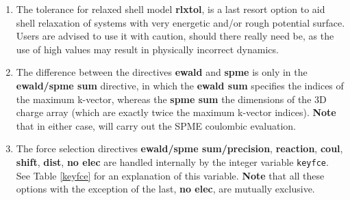 \begin{enumerate}
\item The tolerance for relaxed shell model {\bf rlxtol}, is a last
resort option to aid shell relaxation of systems with very energetic
and/or rough potential surface.  Users are advised to use it with
caution, should there really need be, as the use of high values may
result in physically incorrect dynamics.

\item The difference between the directives {\bf ewald} and {\bf spme}
is only in the {\bf ewald/spme sum} directive, in which the
{\bf ewald sum} specifies the indices of the maximum k-vector, whereas
the {\bf spme sum} the dimensions of the 3D charge array
(which are exactly twice the maximum k-vector indices).  {\bf Note}
that in either case, \D will carry out the
SPME coulombic evaluation.

\item The force selection directives
{\bf ewald/spme sum/precision},
{\bf reaction}, {\bf coul}, {\bf shift}, {\bf dist}, {\bf no elec}
are handled internally by the integer variable {\tt keyfce}.
See Table \ref{keyfce} for an explanation of this variable.
{\bf Note} that all these options with the exception of the last,
{\bf no elec}, are mutually exclusive.

\begin{table}[htbp]
\end{table}


\end{enumerate}
